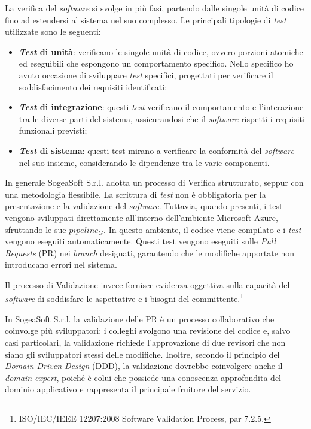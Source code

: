         \noindent La verifica del \textit{software} si svolge in più fasi, partendo dalle singole unità di codice fino ad estendersi al sistema nel suo complesso. Le principali tipologie di \textit{test} utilizzate sono le seguenti:

        \begin{itemize}
        \item \textbf{\textit{Test} di unità}: verificano le singole unità di codice, ovvero porzioni atomiche ed eseguibili che espongono un comportamento specifico. Nello specifico ho avuto occasione di sviluppare \textit{test} specifici, progettati per verificare il soddisfacimento dei requisiti identificati;

        \item \textbf{\textit{Test} di integrazione}: questi \textit{test} verificano il comportamento e l'interazione tra le diverse parti del sistema, assicurandosi che il \textit{software} rispetti i requisiti funzionali previsti;

        \item \textbf{\textit{Test} di sistema}: questi test mirano a verificare la conformità del \textit{software} nel suo insieme, considerando le dipendenze tra le varie componenti.
        \end{itemize}

        \noindent In generale SogeaSoft S.r.l. adotta un processo di Verifica strutturato, seppur con una metodologia flessibile. La scrittura di \textit{test} non è obbligatoria per la presentazione e la validazione del \textit{software}. Tuttavia, quando presenti, i test vengono sviluppati direttamente all’interno dell'ambiente Microsoft Azure, sfruttando le sue \textit{$pipeline_G$}. In questo ambiente, il codice viene compilato e i \textit{test} vengono eseguiti automaticamente. Questi test vengono eseguiti sulle \textit{Pull Requests} (PR) nei \textit{branch} designati, garantendo che le modifiche apportate non introducano errori nel sistema. 
        
        \noindent Il processo di Validazione invece fornisce evidenza oggettiva sulla capacità del \textit{software} di soddisfare le aspettative e i bisogni del committente.\footnote{ISO/IEC/IEEE 12207:2008 Software Validation Process, par 7.2.5.}

        \noindent In SogeaSoft S.r.l. la validazione delle PR è un processo collaborativo che coinvolge più sviluppatori: i colleghi svolgono una revisione del codice e, salvo casi particolari, la validazione richiede l’approvazione di due revisori che non siano gli sviluppatori stessi delle modifiche. Inoltre, secondo il principio del \textit{Domain-Driven Design} (DDD), la validazione dovrebbe coinvolgere anche il \textit{domain expert}, poiché è colui che possiede una conoscenza approfondita del dominio applicativo e rappresenta il principale fruitore del servizio.
        
